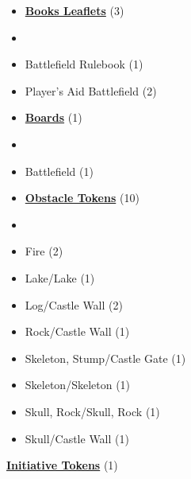 
\begin{multicols}{3}

\footnotesize

\begin{itemize}[leftmargin=0pt, label={}, noitemsep]
  \item \textbf{\small{\underline{Books Leaflets}}} (3)
  \item
  \item Battlefield Rulebook (1)
  \item Player's Aid Battlefield (2)
\end{itemize}

\begin{itemize}[leftmargin=0pt, label={}, noitemsep]
  \item \textbf{\small{\underline{Boards}}} (1)
  \item
  \item Battlefield (1)
\end{itemize}

\begin{itemize}[leftmargin=0pt, label={}, noitemsep]
  \item \textbf{\small{\underline{Obstacle Tokens}}} (10)
  \item
  \item Fire (2)
  \item Lake/Lake (1)
  \item Log/Castle Wall (2)
  \item Rock/Castle Wall (1)
  \item Skeleton, Stump/Castle Gate (1)
  \item Skeleton/Skeleton (1)
  \item Skull, Rock/Skull, Rock (1)
  \item Skull/Castle Wall (1)
\end{itemize}

\textbf{\small{\underline{Initiative Tokens}}} (1)

\vspace*{\fill}
\columnbreak


\end{multicols}
